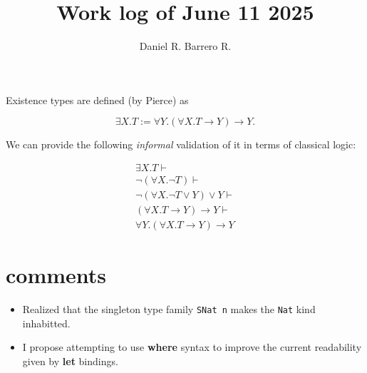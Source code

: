 \documentclass{amsart}
\title{Work log of June 11 2025}
\author{Daniel R. Barrero R.}
\begin{document}
\maketitle

Existence types are defined (by Pierce) as  

$$
\exists X . T := \forall Y . (\forall X . T \to Y) \to Y.
$$

We can provide the following \emph{informal} validation of it in
terms of classical logic:

\begin{eqnarray*}
	\exists X . T \vdash \\
	\neg (\forall X . \neg T) \vdash \\
	\neg (\forall X . \neg T \lor Y) \lor Y \vdash \\
	(\forall X . T \to Y) \to Y \vdash \\
	\forall Y . (\forall X . T \to Y) \to Y
\end{eqnarray*}

\section{comments}

\begin{itemize}
	\item Realized that the singleton type family \texttt{SNat n} makes the
		\texttt{Nat} kind inhabitted.
	\item I propose attempting to use \textbf{where} syntax to improve the
		current readability given by \textbf{let} bindings.
\end{itemize}
\end{document}
